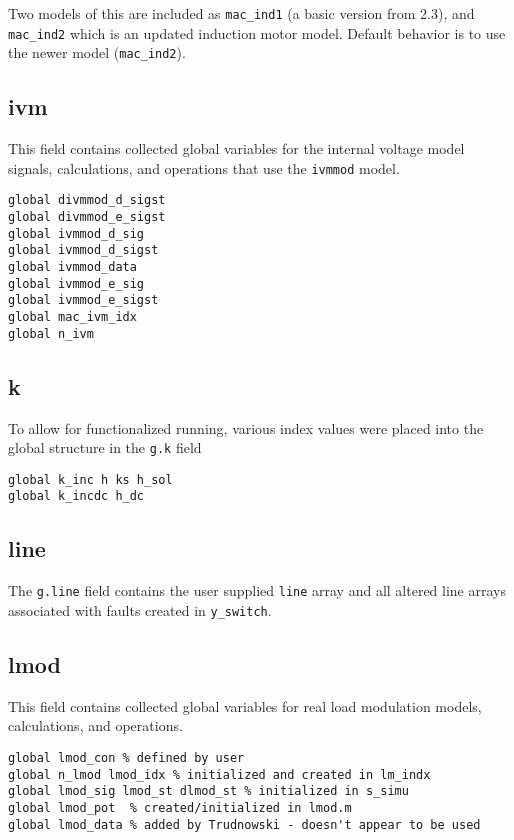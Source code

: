 Two models of this are included as \verb|mac_ind1| (a basic version from 2.3), and \verb|mac_ind2| which is an updated induction motor model. Default behavior is to use the newer model (\verb|mac_ind2|).

\subsection{ivm} 
This field contains collected global variables for the internal voltage model signals, calculations, and operations that use the \verb|ivmmod| model.
\begin{verbatim}
global divmmod_d_sigst
global divmmod_e_sigst
global ivmmod_d_sig
global ivmmod_d_sigst
global ivmmod_data
global ivmmod_e_sig
global ivmmod_e_sigst
global mac_ivm_idx
global n_ivm
\end{verbatim}

\subsection{k}  
To allow for functionalized running, various index values were placed into the global structure in the \verb|g.k| field

\begin{verbatim}
global k_inc h ks h_sol
global k_incdc h_dc
\end{verbatim}

\subsection{line}  
The \verb|g.line| field contains the user supplied \verb|line| array and all altered line arrays associated with faults created in \verb|y_switch|.

\subsection{lmod}
This field contains collected global variables for real load modulation models, calculations, and operations.
\begin{verbatim}
global lmod_con % defined by user
global n_lmod lmod_idx % initialized and created in lm_indx
global lmod_sig lmod_st dlmod_st % initialized in s_simu
global lmod_pot  % created/initialized in lmod.m 
global lmod_data % added by Trudnowski - doesn't appear to be used
\end{verbatim}

